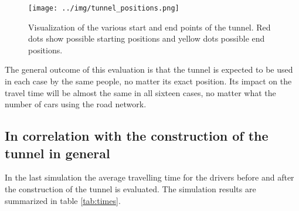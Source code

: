 \documentclass[11pt]{article}
\begin{document}
\begin{figure}[htb]
	\begin{center}
		\texttt{[image: ../img/tunnel\_positions.png]}
	\end{center}
	\caption{Visualization of the various start and end points of the tunnel.
	Red dots show possible starting positions and yellow dots possible end positions.}
	\label{fig:tunnel_pos}
\end{figure}

The general outcome of this evaluation is that the tunnel is expected to be used in each case by the same people, no matter its exact position. Its impact on the travel time will be almost the same in all sixteen cases, no matter what the number of cars using the road network.

\subsection{In correlation with the construction of the tunnel in general} %
\label{sub:in_correlation_with_the_construction_of_the_tunnel_in_general}
In the last simulation the average travelling time for the drivers before and after the construction of the tunnel is evaluated. The simulation results are summarized in table \ref{tab:times}.
\end{document}
